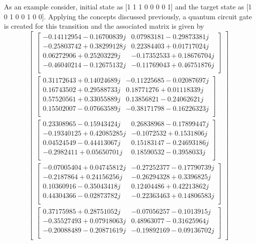 \documentclass[conference]{IEEEtran}
\begin{document}
As an example consider, initial state as [1 1 1 0 0 0 0 1] and the target state as [1 0 1 0 0 1 0 0]. Applying the concepts discussed previously, a quantum circuit gate is created for this transition and the associated matrix is given by 
$$
\begin{bmatrix}
\begin{bmatrix}
-0.14112954-0.16700839j& 0.07983181-0.29873381j\\
-0.25803742+0.38299128j& 0.22384403+0.01717024j\\
0.06272906+0.25203229j& -0.17352533+0.18676704j\\
-0.46040214-0.12675132j& -0.11769043+0.46751876j\\
\end{bmatrix}\\
\begin{bmatrix}
0.31172643+0.14024689j& -0.11225685-0.02087697j\\
0.16743502+0.29588733j&  0.18771276+0.01118339j\\
0.57520561+0.33055889j&  0.13856821-0.24062621j\\
0.15502007-0.07663589j& -0.38171798-0.16226323j\\
\end{bmatrix}\\
\begin{bmatrix}
0.23308965-0.15943424j& 0.26838968-0.17899447j\\
-0.19340125+0.42085285j&-0.1072532 +0.1531806j\\
0.04524549-0.44413067j& 0.15183147-0.24693186j\\
-0.2982411 +0.05650701j&  0.18590532-0.3958033j\\
\end{bmatrix}\\
\begin{bmatrix}
-0.07005404+0.04745812j& -0.27252377-0.17790739j\\
-0.2187864 +0.24156256j& -0.26294328+0.3396825j\\
0.10360916-0.35043418j&  0.12404486+0.42213862j\\
0.44304366-0.02873782j& -0.22363463+0.14806583j\\
\end{bmatrix}\\
\begin{bmatrix}
0.37175985+0.28751052j &-0.07056257-0.1013915j\\  
-0.35527493+0.07918063j & 0.48963077-0.31625964j\\
-0.20088489-0.20871619j &-0.19892169-0.09136702j\\

\end{bmatrix}
\end{bmatrix}$$
\end{document}

